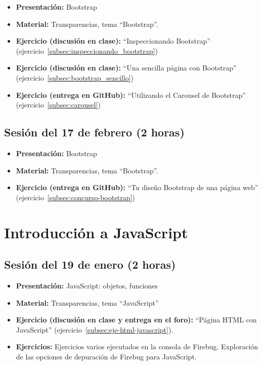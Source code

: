 \documentclass[a4paper,12pt]{report}
\begin{document}
\begin{itemize}
\item \textbf{Presentación:} Bootstrap
\item \textbf{Material:} Transparencias, tema ``Bootstrap''.
\item \textbf{Ejercicio (discusión en clase):} ``Inspeccionando Bootstrap'' (ejercicio~\ref{subsec:inspeccionando_bootstrap})
\item \textbf{Ejercicio (discusión en clase):} ``Una sencilla página con Bootstrap'' (ejercicio~\ref{subsec:bootstrap_sencillo})
\item \textbf{Ejercicio (entrega en GitHub):} ``Utilizando el Carousel de Bootstrap'' (ejercicio~\ref{subsec:carousel})

\end{itemize}

\subsection{Sesión del 17 de febrero (2 horas)}

\begin{itemize}
\item \textbf{Presentación:} Bootstrap
\item \textbf{Material:} Transparencias, tema ``Bootstrap''.
\item \textbf{Ejercicio (entrega en GitHub):} ``Tu diseño Bootstrap de una página web'' (ejercicio~\ref{subsec:concurso-bootstrap})
\end{itemize}




\section{Introducción a JavaScript}

\subsection{Sesión del 19 de enero (2 horas)}

\begin{itemize}
\item \textbf{Presentación:} JavaScript: objetos, funciones
\item \textbf{Material:} Transparencias, tema ``JavaScript''
\item \textbf{Ejercicio (discusión en clase y entrega en el foro):} ``Página HTML con JavaScript'' (ejercicio~\ref{subsec:eje-html-javascript}).
\item \textbf{Ejercicios:} Ejercicios varios ejecutados en la consola de Firebug. Exploración de las opciones de depuración de Firebug para JavaScript.
\end{itemize}
\end{document}
